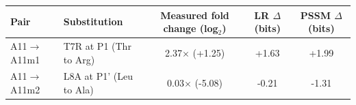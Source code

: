 \begin{tabular}{@{}llccc@{}}\toprule
Pair & Substitution & Measured fold change (log$_2$) & LR $\Delta$ (bits) & PSSM $\Delta$ (bits) \\\midrule
A11$\to$A11m1 & T7R at P1 (Thr to Arg) & 2.37$\times$ (+1.25) & +1.63 & +1.99 \\
A11$\to$A11m2 & L8A at P1' (Leu to Ala) & 0.03$\times$ (-5.08) & -0.21 & -1.31 \\
\bottomrule\end{tabular}

